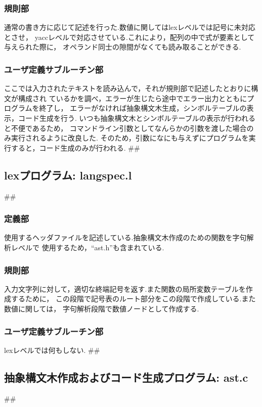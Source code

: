 \documentclass[a4paper,11pt]{jarticle}
\begin{document}
{\subsubsection{規則部}
通常の書き方に応じて記述を行った.数値に関してはlexレベルでは記号に未対応とさせ，
yaccレベルで対応させている.これにより，配列の中で式が要素として与えられた際に，
オペランド同士の隙間がなくても読み取ることができる.
\subsubsection{ユーザ定義サブルーチン部}
ここでは入力されたテキストを読み込んで，それが規則部で記述したとおりに構文が構成され
ているかを調べ，エラーが生じたら途中でエラー出力とともにプログラムを終了し，
エラーがなければ抽象構文木生成，シンボルテーブルの表示，コード生成を行う.
いつも抽象構文木とシンボルテーブルの表示が行われると不便であるため，
コマンドライン引数としてなんらかの引数を渡した場合のみ実行されるように改良した.
そのため，引数になにも与えずにプログラムを実行すると，コード生成のみが行われる.
##
\subsection{lexプログラム: langspec.l}
##
\subsubsection{定義部}
使用するヘッダファイルを記述している.抽象構文木作成のための関数を字句解析レベルで
使用するため，``ast.h''も含まれている.
\subsubsection{規則部}
入力文字列に対して，適切な終端記号を返す.また関数の局所変数テーブルを作成するために，
この段階で記号表のルート部分をこの段階で作成している.また数値に関しては，
字句解析段階で数値ノードとして作成する.
\subsubsection{ユーザ定義サブルーチン部}
lexレベルでは何もしない.
##
\subsection{抽象構文木作成およびコード生成プログラム: ast.c}
##
}
\end{document}
